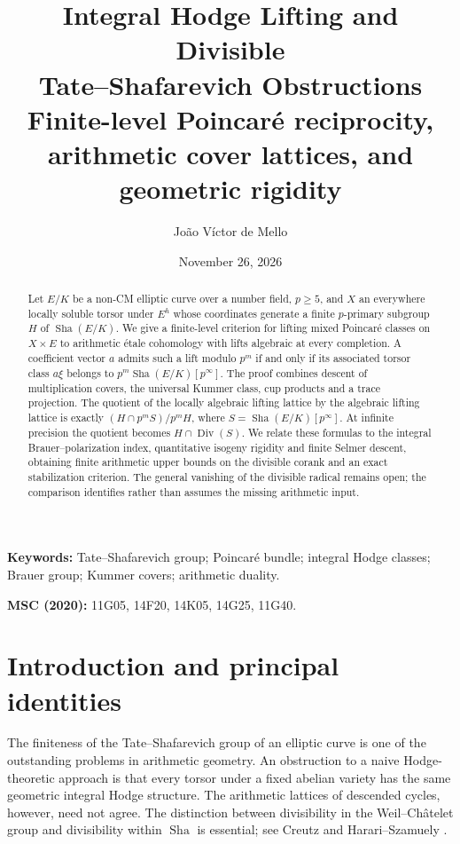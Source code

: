 \documentclass[11pt,a4paper]{article}
\title{\vspace{-1.2em}\textbf{Integral Hodge Lifting and Divisible\protect\\ Tate--Shafarevich Obstructions}\protect\\[6pt]\large Finite-level Poincar\'e reciprocity, arithmetic cover lattices, and geometric rigidity}
\author{Jo\~ao V\'ictor de Mello}
\date{November 26, 2026}
\theoremstyle{remark}\newtheorem{remark}[theorem]{Remark}
\newcommand{\Sha}{\mathop{\mathrm{Sha}}}\newcommand{\Pic}{\operatorname{Pic}}\newcommand{\Br}{\operatorname{Br}}\newcommand{\NS}{\operatorname{NS}}\newcommand{\Gal}{\operatorname{Gal}}\newcommand{\Hom}{\operatorname{Hom}}\newcommand{\Z}{\mathbb Z}\newcommand{\Q}{\mathbb Q}\newcommand{\F}{\mathbb F}\newcommand{\G}{\mathbb G}\newcommand{\coker}{\operatorname{coker}}\newcommand{\loc}{\operatorname{loc}}\newcommand{\et}{\mathrm{\acute et}}\newcommand{\Div}{\operatorname{Div}}\newcommand{\ord}{\operatorname{ord}}\newcommand{\im}{\operatorname{im}}\newcommand{\diag}{\operatorname{diag}}\newcommand{\rank}{\operatorname{rank}}\newcommand{\Sel}{\operatorname{Sel}}
\begin{document}
\maketitle\thispagestyle{plain}
\begin{abstract}
Let $E/K$ be a non-CM elliptic curve over a number field, $p\ge5$, and $X$ an everywhere locally soluble torsor under $E^h$ whose coordinates generate a finite $p$-primary subgroup $H$ of $\Sha(E/K)$. We give a finite-level criterion for lifting mixed Poincar\'e classes on $X\times E$ to arithmetic \'etale cohomology with lifts algebraic at every completion. A coefficient vector $a$ admits such a lift modulo $p^m$ if and only if its associated torsor class $a\xi$ belongs to $p^m\Sha(E/K)[p^\infty]$. The proof combines descent of multiplication covers, the universal Kummer class, cup products and a trace projection. The quotient of the locally algebraic lifting lattice by the algebraic lifting lattice is exactly $(H\cap p^m S)/p^mH$, where $S=\Sha(E/K)[p^\infty]$. At infinite precision the quotient becomes $H\cap\Div(S)$. We relate these formulas to the integral Brauer--polarization index, quantitative isogeny rigidity and finite Selmer descent, obtaining finite arithmetic upper bounds on the divisible corank and an exact stabilization criterion. The general vanishing of the divisible radical remains open; the comparison identifies rather than assumes the missing arithmetic input.
\end{abstract}
\noindent\textbf{Keywords:} Tate--Shafarevich group; Poincar\'e bundle; integral Hodge classes; Brauer group; Kummer covers; arithmetic duality.\par
\noindent\textbf{MSC (2020):} 11G05, 14F20, 14K05, 14G25, 11G40.
\section{Introduction and principal identities}
The finiteness of the Tate--Shafarevich group of an elliptic curve is one of the outstanding problems in arithmetic geometry. An obstruction to a naive Hodge-theoretic approach is that every torsor under a fixed abelian variety has the same geometric integral Hodge structure. The arithmetic lattices of descended cycles, however, need not agree. The distinction between divisibility in the Weil--Ch\^atelet group and divisibility within $\Sha$ is essential; see Creutz \cite{creutz} and Harari--Szamuely \cite{hs,hs2}.
\end{document}

